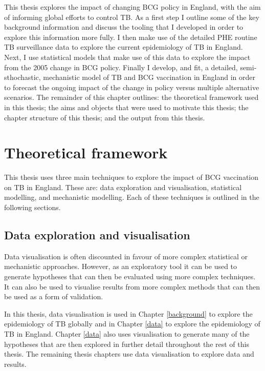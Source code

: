 \documentclass[11pt,twoside]{bristolthesis}
\begin{document}
  This thesis explores the impact of changing BCG policy in England, with the aim of informing global efforts to control TB. As a first step I outline some of the key background information and discuss the tooling that I developed in order to explore this information more fully. I then make use of the detailed PHE routine TB surveillance data to explore the current epidemiology of TB in England. Next, I use statistical models that make use of this data to explore the impact from the 2005 change in BCG policy. Finally I develop, and fit, a detailed, semi-sthochastic, mechanistic model of TB and BCG vaccination in England in order to forecast the ongoing impact of the change in policy versus multiple alternative scenarios. The remainder of this chapter outlines: the theoretical framework used in this thesis; the aims and objects that were used to motivate this thesis; the chapter structure of this thesis; and the output from this thesis.
  
  \hypertarget{theoretical-framework}{%
  \section{Theoretical framework}\label{theoretical-framework}}
  
  This thesis uses three main techniques to explore the impact of BCG vaccination on TB in England. These are: data exploration and visualisation, statistical modelling, and mechanistic modelling. Each of these techniques is outlined in the following sections.
  
  \hypertarget{data-exploration-and-visualisation}{%
  \subsection{Data exploration and visualisation}\label{data-exploration-and-visualisation}}
  
  Data visualisation is often discounted in favour of more complex statistical or mechanistic approaches. However, as an exploratory tool it can be used to generate hypotheses that can then be evaluated using more complex techniques. It can also be used to visualise results from more complex methods that can then be used as a form of validation.
  
  In this thesis, data visualisation is used in Chapter \ref{background} to explore the epidemiology of TB globally and in Chapter \ref{data} to explore the epidemiology of TB in England. Chapter \ref{data} also uses visualisation to generate many of the hypotheses that are then explored in further detail throughout the rest of this thesis. The remaining thesis chapters use data visualisation to explore data and results.
  
\end{document}
